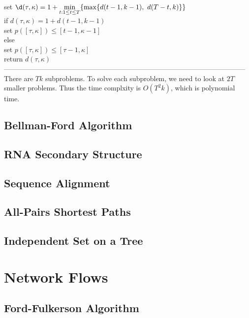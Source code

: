 \documentclass{article}
\newcommand{\ka}{\kappa}
\newcommand{\ds}{\displaystyle}
\begin{document}
	\hspace*{21mm} set $\ds \d(\tau, \ka) = 1 + \min_{t : 1\leq t \leq T}\{\max\{d(t-1, k-1),\ d(T-t, k)\}\}$\\
	\hspace*{21mm} if $d(\tau, \ka) = 1 + d(t-1, k-1)$\\
	\hspace*{28mm} set $p([\tau, \ka]) \leq [t-1, \ka-1]$\\
	\hspace*{21mm} else\\
	\hspace*{28mm} set $p([\tau, \ka]) \leq [\tau-1, \ka]$\\
	\hspace*{7mm} return $d(\tau, \ka)$\\
---------------------------------------------------------------------------------------------------------\\
There are $Tk$ subproblems. To solve each subproblem, we need to look at $2T$ smaller problems. Thus the time complxity is $O(T^2k)$, which is polynomial time.
\subsection{Bellman-Ford Algorithm}
\subsection{RNA Secondary Structure}
\subsection{Sequence Alignment}
\subsection{All-Pairs Shortest Paths}
\subsection{Independent Set on a Tree}
\newpage


\section{Network Flows}
\subsection{Ford-Fulkerson Algorithm}
\end{document}
